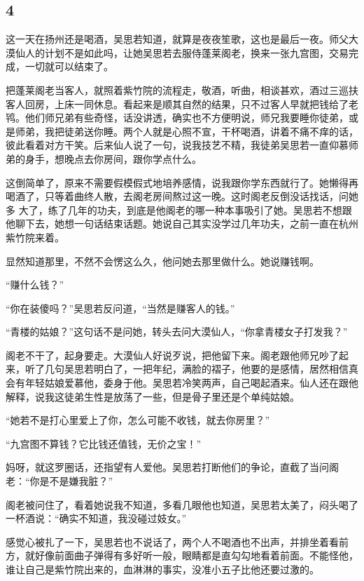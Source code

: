 {\centering\subsection{4}}

这一天在扬州还是喝酒，吴思若知道，就算是夜夜笙歌，这也是最后一夜。师父大漠仙人的计划不是如此吗，让她吴思若去服侍蓬莱阁老，换来一张九宫图，交易完成，一切就可以结束了。

把蓬莱阁老当客人，就照着紫竹院的流程走，敬酒，听曲，相谈甚欢，酒过三巡扶客人回房，上床一同休息。看起来是顺其自然的结果，只不过客人早就把钱给了老鸨。他们师兄弟有些奇怪，话没讲透，确实也不方便明说，师兄我要睡你徒弟，或是师弟，我把徒弟送你睡。两个人就是心照不宣，干杯喝酒，讲着不痛不痒的话，彼此看着对方干笑。后来仙人说了一句，说我技艺不精，我徒弟吴思若一直仰慕师弟的身手，想晚点去你房间，跟你学点什么。

这倒简单了，原来不需要假模假式地培养感情，说我跟你学东西就行了。她懒得再喝酒了，只等着曲终人散，去阁老房间熬过这一晚。这时阁老反倒没话找话，问她多
大了，练了几年的功夫，到底是他阁老的哪一种本事吸引了她。吴思若不想跟他聊下去，她想一句话结束话题。她说自己其实没学过几年功夫，之前一直在杭州紫竹院来着。

显然知道那里，不然不会愣这么久，他问她去那里做什么。她说赚钱啊。

“赚什么钱？”

“你在装傻吗？”吴思若反问道，“当然是赚客人的钱。”

“青楼的姑娘？”这句话不是问她，转头去问大漠仙人，“你拿青楼女子打发我？”

阁老不干了，起身要走。大漠仙人好说歹说，把他留下来。阁老跟他师兄吵了起来，听了几句吴思若明白了，一把年纪，满脸的褶子，他要的是感情，居然相信真会有年轻姑娘爱慕他，委身于他。吴思若冷笑两声，自己喝起酒来。仙人还在跟他解释，说我这徒弟生性是放荡了一些，但是骨子里还是个单纯姑娘。

“她若不是打心里爱上了你，怎么可能不收钱，就去你房里？”

“九宫图不算钱？它比钱还值钱，无价之宝！”

妈呀，就这罗圈话，还指望有人爱他。吴思若打断他们的争论，直截了当问阁老：“你是不是嫌我脏？”

阁老被问住了，看着她说我不知道，多看几眼他也知道，吴思若太美了，闷头喝了一杯酒说：“确实不知道，我没碰过妓女。”

感觉心被扎了一下，吴思若也不说话了，两个人不喝酒也不出声，并排坐着看前方，就好像前面曲子弹得有多好听一般，眼睛都是直勾勾地看着前面。不能怪他，谁让自己是紫竹院出来的，血淋淋的事实，没准小五子比他还要过激的。

